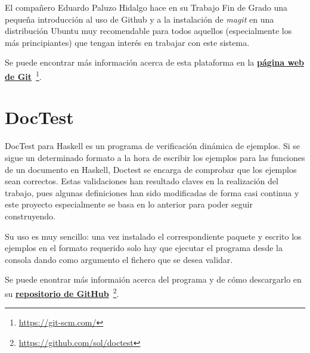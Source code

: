 El compañero Eduardo Paluzo Hidalgo hace en su Trabajo Fin de Grado una pequeña
introducción al uso de Github y a la instalación de \textit{magit} en una
distribución Ubuntu muy recomendable para todos aquellos (especialmente los más 
principiantes) que tengan interés en trabajar con este sistema.

Se puede encontrar más información acerca de esta plataforma en la 
\href{https://git-scm.com/}
  {\textbf{página web de Git}}\
  \footnote{\url{https://git-scm.com/}}.

\section*{DocTest}

DocTest para Haskell es un programa de verificación dinámica de ejemplos. 
Si se sigue un determinado formato a la hora de escribir los ejemplos para
las funciones de un documento en Haskell, Doctest se encarga de comprobar
que los ejemplos sean correctos. Estas validaciones han resultado claves
en la realización del trabajo, pues algunas definiciones han sido modificadas 
de forma casi continua y este proyecto especialmente se basa en lo anterior
para poder seguir construyendo.

Su uso es muy sencillo: una vez instalado el correspondiente paquete y escrito
los ejemplos en el formato requerido solo hay que ejecutar el programa desde la
consola dando como argumento el fichero que se desea validar.

Se puede enontrar más informaión acerca del programa y de cómo descargarlo en
su \href{https://github.com/sol/doctest}
  {\textbf{repositorio de GitHub}}\
  \footnote{\url{https://github.com/sol/doctest}}.

